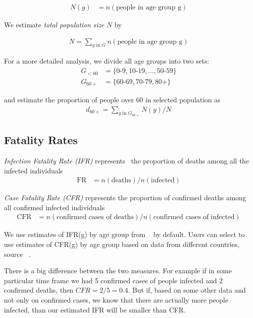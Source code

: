 \documentclass[12pt]{article}
\begin{document}
\begin{align*}
N(g) &=
  n(\text{people in age group g})
\end{align*}

We estimate {\it total population size} $N$ by

\begin{align*}
N = \sum_{g \text{ in } G}
  n(\text{people in age group g})
\end{align*}

For a more detailed analysis, we divide all age groups into two sets:
\begin{align*}
G_{<60} &=
  \{ \text{0-9}, \text{10-19}, \ldots, \text{50-59} \} \\
G_{60+} &=
  \{ \text{60-69}, \text{70-79}, \text{80+} \}
\end{align*}

and estimate the proportion of people over 60 in selected population as
\begin{align*}
d_{60+} = \sum_{g \text{ in } G_{60+}} N(g) / N
\end{align*}

\subsection*{Fatality Rates}
{\it Infection Fatality Rate (IFR)} represents~\cite{cfr_wiki} the proportion of deaths among all the infected individuals
\begin{align*}
\text{FR} &=
  n(\text{deaths}) /
  n(\text{infected})
\end{align*}

{\it Case Fatality Rate (CFR)} represents the proportion of confirmed deaths among all confirmed infected individuals
\begin{align*}
\text{CFR} &=
 n( \text{confirmed cases of deaths} ) /
 n( \text{confirmed cases of infected} )
\end{align*}

We use estimates of IFR(g) by age group from ~\cite{imperial} by default. Users can select to use estimates of CFR(g) by age group based on data from different countries, source ~\cite{cfrs}.

There is a big difference between the two measures. For example if in some particular time frame we had 5 confirmed cases of people infected and 2 confirmed deaths, then $CFR = 2/5 = 0.4$. But if, based on some other data and not only on confirmed cases, we know that there are actually more people infected, than our estimated IFR will be smaller than CFR.
\end{document}
